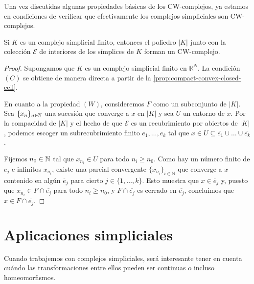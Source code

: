 Una vez discutidas algunas propiedades básicas de los CW-complejos, ya estamos
en condiciones de verificar que efectivamente los complejos simpliciales son CW-complejos.

\begin{proposicion}
	Si $K$ es un complejo simplicial finito, entonces el poliedro $|K|$ junto con
	la colección $\mathcal{E}$ de interiores de los símplices de $K$ forman un CW-complejo.
\end{proposicion}
\begin{proof}
	Supongamos que $K$ es un complejo simplicial finito en $\mathbb{R}^{N}$. La
	condición $(C)$ se obtiene de manera directa a partir de la
	\autoref{prop:compact-convex-closed-cell}.
	
	En cuanto a la propiedad $(W)$, consideremos $F$ como un subconjunto de $|K|$.
	Sea $\{x_{n}\}_{n \in \mathbb{N}}$ una sucesión que converge a $x$ en $|K|$ y sea $U$
	un entorno de $x$. Por la compacidad de $|K|$ y el hecho de que $\mathcal{E}$ es
	un recubrimiento por abiertos de $|K|$, podemos escoger un subrecubrimiento
	finito $e_{1}, \ldots, e_{k}$ tal que
	$x \in U \subseteq \overline{e_1}\cup \ldots \cup \overline{e_k}$.
	
	Fijemos $n_{0} \in \mathbb{N}$ tal que $x_{n_i}\in U$ para todo $n_{i} \geq n_{0}$. Como
	hay un número finito de $e_{j}$ e infinitos $x_{n_i}$, existe una parcial
	convergente $\{x_{n_i}\}_{i \in \mathbb{N}}$ que converge a $x$ contenido en
	algún $\overline{e}_{j}$ para cierto $j \in \{1, \ldots, k\}$. Esto muestra que
	$x \in \overline{e}_{j}$ y, puesto que $x_{n_i}\in F \cap \overline{e_j}$ para
	todo $n_{i} \geq n_{0}$, y $F \cap \overline{e_j}$ es cerrado en $\overline{e_j}$,
	concluimos que $x \in F \cap \overline{e_j}$.
\end{proof}

\section{Aplicaciones simpliciales}

Cuando trabajemos con complejos simpliciales, será interesante tener en cuenta cuándo
las transformaciones entre ellos pueden ser continuas o incluso homeomorfismos.

